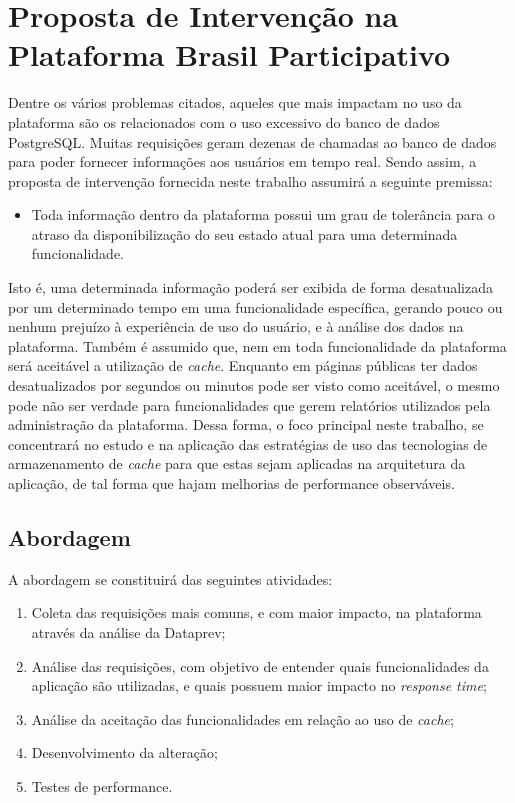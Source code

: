 \section{Proposta de Intervenção na Plataforma Brasil Participativo}
\label{sec:proposta_de_intervencao_na_plataforma_brasil_participativo}

Dentre os vários problemas citados, aqueles que mais impactam no uso da plataforma são os relacionados com o uso excessivo do banco de dados PostgreSQL. Muitas requisições geram dezenas de chamadas ao banco de dados para poder fornecer informações aos usuários em tempo real. Sendo assim, a proposta de intervenção fornecida neste trabalho assumirá a seguinte premissa:

\begin{itemize}
    \item Toda informação dentro da plataforma possui um grau de tolerância para o atraso da disponibilização do seu estado atual para uma determinada funcionalidade.
\end{itemize}

Isto é, uma determinada informação poderá ser exibida de forma desatualizada por um determinado tempo em uma funcionalidade específica, gerando pouco ou nenhum prejuízo à experiência de uso do usuário, e à análise dos dados na plataforma. Também é assumido que, nem em toda funcionalidade da plataforma será aceitável a utilização de \textit{cache}. Enquanto em páginas públicas ter dados desatualizados por segundos ou minutos pode ser visto como aceitável, o mesmo pode não ser verdade para funcionalidades que gerem relatórios utilizados pela administração da plataforma. Dessa forma, o foco principal neste trabalho, se concentrará no estudo e na aplicação das estratégias de uso das tecnologias de armazenamento de \textit{cache} para que estas sejam aplicadas na arquitetura da aplicação, de tal forma que hajam melhorias de performance observáveis.

\subsection{Abordagem}

A abordagem se constituirá das seguintes atividades:

\begin{enumerate}
    \item Coleta das requisições mais comuns, e com maior impacto, na plataforma através da análise da Dataprev;\label{enum:coleta_das_requisicoes}
    \item Análise das requisições, com objetivo de entender quais funcionalidades da aplicação são utilizadas, e quais possuem maior impacto no \textit{response time};
    \item Análise da aceitação das funcionalidades em relação ao uso de \textit{cache};
    \item Desenvolvimento da alteração;
    \item Testes de performance.
\end{enumerate}

